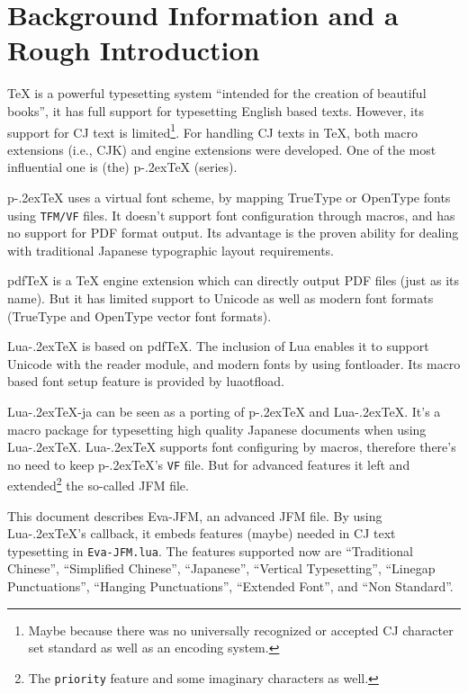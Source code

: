 \documentclass[twoside]{article}
\def\LuaTeX{Lua\kern-.2ex\TeX}
\def\pTeX{p\kern-.2ex\TeX}
\def\pdfTeX{pdf\TeX}
\begin{document}
\section{Background Information and a Rough Introduction}
{\TeX} is a powerful typesetting system ``intended for the creation of beautiful books'', it has full support for typesetting English based texts. However, its support for CJ text is limited\footnote{Maybe because there was no universally recognized or accepted CJ character set standard as well as an encoding system.}. For handling CJ texts in {\TeX}, both macro extensions (i.e., \textsf{CJK}) and engine extensions were developed. One of the most influential one is (the) {\pTeX} (series).\par
{\pTeX} uses a virtual font scheme, by mapping TrueType or OpenType fonts using \texttt{TFM/VF} files. It doesn't support font configuration through macros, and has no support for PDF format output. Its advantage is the proven ability for dealing with traditional Japanese typographic layout requirements.\par
{\pdfTeX} is a {\TeX} engine extension which can directly output PDF files (just as its name). But it has limited support to Unicode as well as modern font formats (TrueType and OpenType vector font formats).\par
{\LuaTeX} is based on {\pdfTeX}. The inclusion of Lua enables it to support Unicode with the \textsf{reader} module, and modern fonts by using \textsf{fontloader}. Its macro based font setup feature is provided by \textsf{luaotfload}.\par
\LuaTeX-ja can be seen as a porting of {\pTeX} and {\LuaTeX}. It's a macro package for typesetting high quality Japanese documents when using {\LuaTeX}. {\LuaTeX} supports font configuring by macros, therefore there's no need to keep {\pTeX}'s \texttt{VF} file. But for advanced features it left and extended\footnote{The \texttt{priority} feature and some imaginary characters as well.} the so-called JFM file.\par
This document describes \textsf{Eva-JFM}, an advanced JFM file. By using {\LuaTeX}'s callback, it embeds features (maybe) needed in CJ text typesetting in \texttt{Eva-JFM.lua}. The features supported now are ``Traditional Chinese'', ``Simplified Chinese'', ``Japanese'', ``Vertical Typesetting'', ``Linegap Punctuations'', ``Hanging Punctuations'', ``Extended Font'', and ``Non Standard''.
\end{document}

